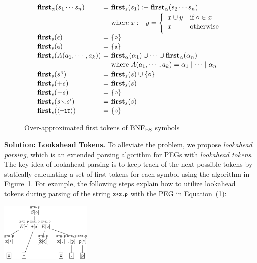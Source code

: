 \begin{figure}[t]
\centering
\small
\[
  \begin{array}{l@{~}c@{~}l}
    \rhsfirst{\symb_1 \cdots \symb_n} &=& \symbfirst{\symb_1} \firstplus
    \rhsfirst{\symb_2 \cdots \symb_n}\\[.1em]
    && \text{where} \; x \firstplus y = \left\{
    \begin{array}{ll}
      x \cup y & \text{if} \; \emptyfirst \in x\\[.1em]
      x & \text{otherwise}\\[.2em]
    \end{array}
    \right.\\[.1em]
    \symbfirst{\epsilon} &=& \{ \emptyfirst \}\\[.1em]
    \symbfirst{\T{a}} &=& \{ \T{a} \} \\[.1em]
    \symbfirst{\NT{A}(\argument_1, \cdots, \argument_k)} &=&
    \rhsfirst{\rhs_1} \cup \cdots \cup \rhsfirst{\rhs_n}\\[.1em]
    && \text{where} \; \NT{A}(\argument_1, \cdots, \argument_k) =
    \rhs_1 \mid \cdots \mid \rhs_n\\[.2em]
    \symbfirst{\symb?} &=& \symbfirst{\symb} \cup \{ \emptyfirst \}\\[.1em]
    \symbfirst{+\symb} &=& \symbfirst{\symb}\\[.1em]
    \symbfirst{-\symb} &=& \{ \emptyfirst \}\\[.1em]
    \symbfirst{\symb \butnot \symb'} &=& \symbfirst{\symb}\\[.1em]
    \symbfirst{\nolt} &=& \{ \emptyfirst \}
  \end{array}
\]
\caption{Over-approximated first tokens of \( \text{BNF}_{\text{ES}} \) symbols}
\label{fig:first-tokens}
\vspace{-1em}
\end{figure}

\smallskip

\textbf{Solution: Lookahead Tokens.}
To alleviate the problem, we propose \textit{lookahead parsing}, which is an
extended parsing algorithm for PEGs with \textit{lookahead tokens}.  The key
idea of lookahead parsing is to keep track of the next possible tokens by
statically calculating a set of first tokens for each symbol using the algorithm in
Figure~\ref{fig:first-tokens}.  For example, the following steps explain how to
utilize lookahead tokens during parsing of the string \( \texttt{\footnotesize x+x.p} \) with
the PEG in Equation~(1):\\[-.5em]
\begin{center}
  \includegraphics[width=0.33\textwidth]{img/laparser}
\end{center}

